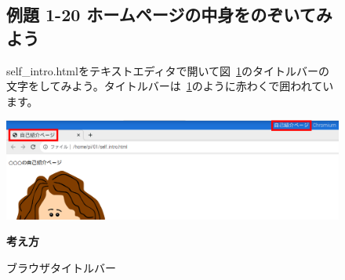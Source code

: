 \begin{figure}[ht]
  \subsection{例題 1-20 ホームページの中身をのぞいてみよう}
  self\_intro.htmlをテキストエディタで開いて図~\ref{fig:36}のタイトルバーの文字をしてみよう。タイトルバーは~\ref{fig:36}のように赤わくで囲われています。

  \centering
  \begin{minipage}{\textwidth}
    \centering
    \includegraphics[width=\textwidth]{text01-img/textbook-img143.png}
    \caption{ブラウザタイトルバー}\label{fig:36}
  \end{minipage}

  
  \flushleft
  \textbf{考え方}


\end{figure}
